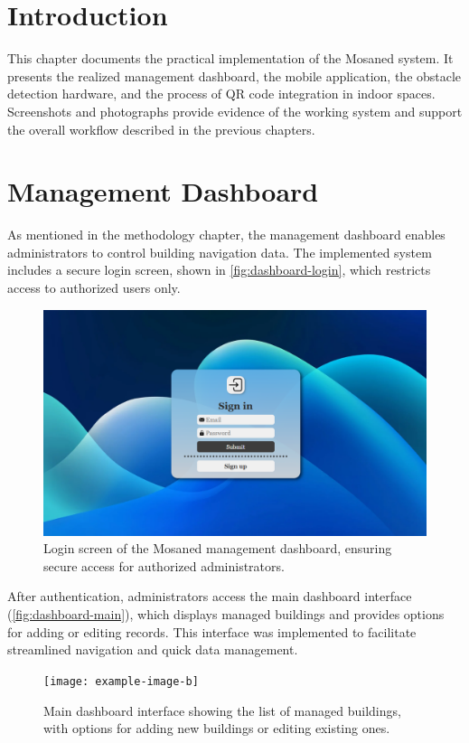 \section{Introduction}

This chapter documents the practical implementation of the Mosaned system. It presents the realized management dashboard, the mobile application, the obstacle detection hardware, and the process of QR code integration in indoor spaces. Screenshots and photographs provide evidence of the working system and support the overall workflow described in the previous chapters.

\section{Management Dashboard}

As mentioned in the methodology chapter, the management dashboard enables administrators to control building navigation data. The implemented system includes a secure login screen, shown in \autoref{fig:dashboard-login}, which restricts access to authorized users only.
\begin{figure}[h]
	\centering
	\includegraphics[width=1\textwidth]{assets/ch5_imp/login_page.png}
	\caption{Login screen of the Mosaned management dashboard, ensuring secure access for authorized administrators.}
	\label{fig:dashboard-login}
\end{figure}

After authentication, administrators access the main dashboard interface (\autoref{fig:dashboard-main}), which displays managed buildings and provides options for adding or editing records. This interface was implemented to facilitate streamlined navigation and quick data management.
\begin{figure}[h]
	\centering
	\texttt{[image: example-image-b]}
	\caption{Main dashboard interface showing the list of managed buildings, with options for adding new buildings or editing existing ones.}
	\label{fig:dashboard-main}
\end{figure}

